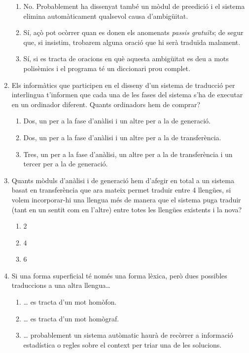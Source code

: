 \begin{enumerate}
\begin{enumerate}
\item No. Probablement ha dissenyat també un mòdul de preedició i el
sistema elimina automàticament qualsevol causa d'ambigüitat.
\item Sí, açò pot ocòrrer quan es donen els anomenats \emph{passis gratuïts};
de segur que, si insistim, trobarem alguna oració que hi serà traduïda
malament.

\item Sí, si es tracta de oracions en què aquesta ambigüitat es deu a
mots polisèmics i el programa té un diccionari prou complet.
\end{enumerate}

\item 
Els informàtics que participen en el disseny d'un sistema
de traducció per interlingua t'informen que cada una de les fases
del sistema s'ha de executar en un ordinador diferent. Quants
ordinadors hem de comprar?

\begin{enumerate}
\item Dos, un per a la fase d'anàlisi i un altre per a la de
generació.
\item Dos, un per a la fase d'anàlisi i un altre per a la de transferència.
\item Tres, un per a la fase d'anàlisi, un altre per a la de
transferència i un tercer per a la de generació.
\end{enumerate}

\item Quants mòduls d'anàlisi i de generació hem d'afegir en total a un
sistema basat en transferència que ara mateix
 permet traduir entre 4 llengües, si volem
incorporar-hi una llengua més de manera
 que el sistema puga traduir (tant en un
sentit com en l'altre) entre totes les llengües existents i la nova?
\begin{enumerate}
\item 2
\item 4
\item 6
\end{enumerate}
\item 
   Si una forma superficial té només una forma lèxica, però dues
   possibles traduccions a una altra llengua{\ldots}
   
\begin{enumerate}
\item {\ldots} es tracta d'un mot homòfon.
\item {\ldots} es tracta d'un mot homògraf.
\item {\ldots} probablement un sistema autòmatic haurà de
    recòrrer a informació estadística o regles sobre el context
    per triar una de les solucions.
\end{enumerate}


\end{enumerate}
